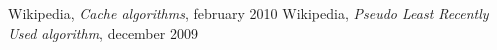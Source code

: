 ﻿%

\begin{thebibliography}{2}
 Wikipedia, {\it Cache algorithms}, february 2010
 Wikipedia, {\it Pseudo Least Recently Used algorithm}, december 2009
\end{thebibliography}
